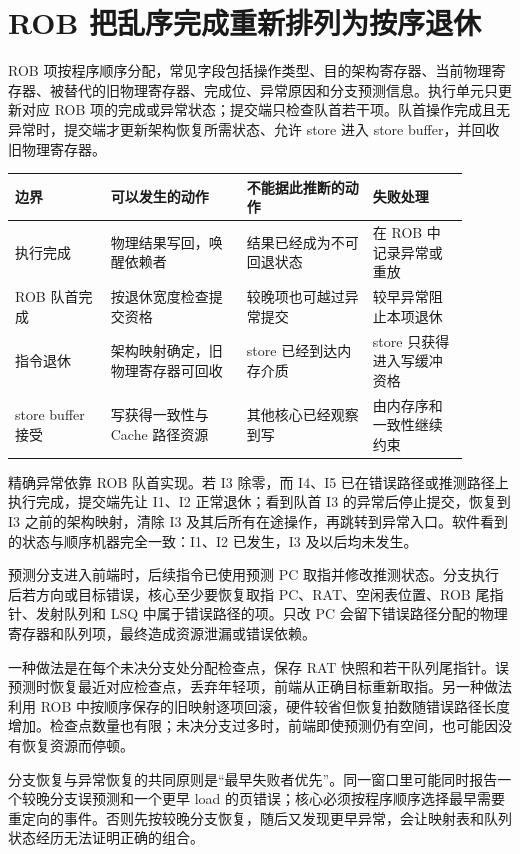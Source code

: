 \section{ROB 把乱序完成重新排列为按序退休}

ROB 项按程序顺序分配，常见字段包括操作类型、目的架构寄存器、当前物理寄存器、被替代的旧物理寄存器、完成位、异常原因和分支预测信息。执行单元只更新对应 ROB 项的完成或异常状态；提交端只检查队首若干项。队首操作完成且无异常时，提交端才更新架构恢复所需状态、允许 store 进入 store buffer，并回收旧物理寄存器。

\begin{longtable}{L{0.19\linewidth}L{0.27\linewidth}L{0.25\linewidth}L{0.19\linewidth}}
\toprule
边界 & 可以发生的动作 & 不能据此推断的动作 & 失败处理 \\
\midrule
执行完成 & 物理结果写回，唤醒依赖者 & 结果已经成为不可回退状态 & 在 ROB 中记录异常或重放 \\
ROB 队首完成 & 按退休宽度检查提交资格 & 较晚项也可越过异常提交 & 较早异常阻止本项退休 \\
指令退休 & 架构映射确定，旧物理寄存器可回收 & store 已经到达内存介质 & store 只获得进入写缓冲资格 \\
store buffer 接受 & 写获得一致性与 Cache 路径资源 & 其他核心已经观察到写 & 由内存序和一致性继续约束 \\
\bottomrule
\end{longtable}

精确异常依靠 ROB 队首实现。若 I3 除零，而 I4、I5 已在错误路径或推测路径上执行完成，提交端先让 I1、I2 正常退休；看到队首 I3 的异常后停止提交，恢复到 I3 之前的架构映射，清除 I3 及其后所有在途操作，再跳转到异常入口。软件看到的状态与顺序机器完全一致：I1、I2 已发生，I3 及以后均未发生。


预测分支进入前端时，后续指令已使用预测 PC 取指并修改推测状态。分支执行后若方向或目标错误，核心至少要恢复取指 PC、RAT、空闲表位置、ROB 尾指针、发射队列和 LSQ 中属于错误路径的项。只改 PC 会留下错误路径分配的物理寄存器和队列项，最终造成资源泄漏或错误依赖。

一种做法是在每个未决分支处分配检查点，保存 RAT 快照和若干队列尾指针。误预测时恢复最近对应检查点，丢弃年轻项，前端从正确目标重新取指。另一种做法利用 ROB 中按顺序保存的旧映射逐项回滚，硬件较省但恢复拍数随错误路径长度增加。检查点数量也有限；未决分支过多时，前端即使预测仍有空间，也可能因没有恢复资源而停顿。

分支恢复与异常恢复的共同原则是“最早失败者优先”。同一窗口里可能同时报告一个较晚分支误预测和一个更早 load 的页错误；核心必须按程序顺序选择最早需要重定向的事件。否则先按较晚分支恢复，随后又发现更早异常，会让映射表和队列状态经历无法证明正确的组合。

